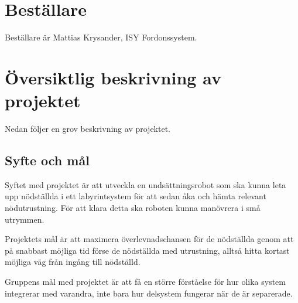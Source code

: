 \documentclass[11pt]{article}
\begin{document}
\begin{flushleft}
\section{Beställare}
Beställare är Mattias Krysander, ISY Fordonssystem.

\section{Översiktlig beskrivning av projektet}
Nedan följer en grov beskrivning av projektet.
\subsection{Syfte och mål}
Syftet med projektet är att utveckla en undsättningsrobot som ska kunna leta upp nödställda i ett labyrintsystem för att sedan åka och hämta relevant nödutrustning. För att klara detta ska roboten kunna manövrera i små utrymmen. 

Projektets mål är att maximera överlevnadschansen för de nödställda genom att på snabbast möjliga tid förse de nödställda med utrustning, alltså hitta kortast möjliga väg från ingång till nödställd.

Gruppens mål med projektet är att få en större förståelse för hur olika system integrerar med varandra, inte bara hur delsystem fungerar när de är separerade.



\end{flushleft}
\end{document}

